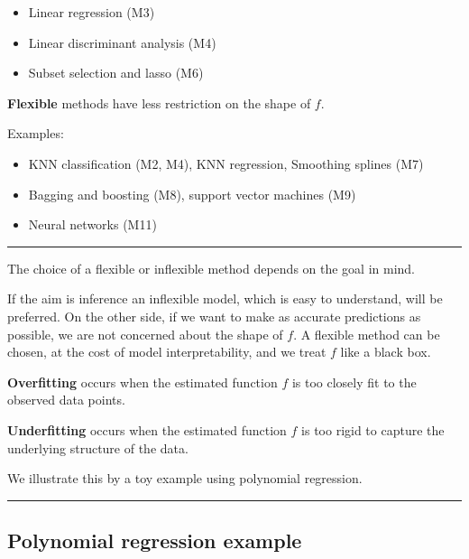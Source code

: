 \documentclass[]{article}
\providecommand{\tightlist}{%
  \setlength{\itemsep}{0pt}\setlength{\parskip}{0pt}}
\begin{document}
\begin{itemize}
\tightlist
\item
  Linear regression (M3)
\item
  Linear discriminant analysis (M4)
\item
  Subset selection and lasso (M6)
\end{itemize}

\textbf{Flexible} methods have less restriction on the shape of \(f\).

Examples:

\begin{itemize}
\tightlist
\item
  KNN classification (M2, M4), KNN regression, Smoothing splines (M7)
\item
  Bagging and boosting (M8), support vector machines (M9)
\item
  Neural networks (M11)
\end{itemize}

\begin{center}\rule{0.5\linewidth}{\linethickness}\end{center}

The choice of a flexible or inflexible method depends on the goal in
mind.

If the aim is inference an inflexible model, which is easy to
understand, will be preferred. On the other side, if we want to make as
accurate predictions as possible, we are not concerned about the shape
of \(f\). A flexible method can be chosen, at the cost of model
interpretability, and we treat \(f\) like a black box.

\textbf{Overfitting} occurs when the estimated function \(f\) is too
closely fit to the observed data points.

\textbf{Underfitting} occurs when the estimated function \(f\) is too
rigid to capture the underlying structure of the data.

We illustrate this by a toy example using polynomial regression.

\begin{center}\rule{0.5\linewidth}{\linethickness}\end{center}

\hypertarget{polynomial-regression-example}{%
\subsection{Polynomial regression
example}\label{polynomial-regression-example}}
\end{document}
